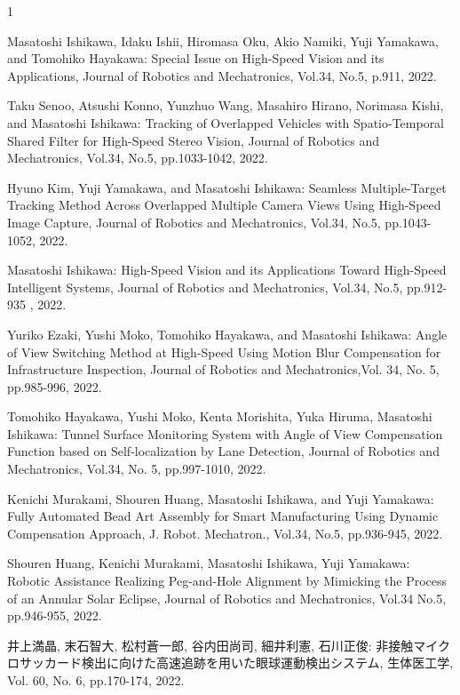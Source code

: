 \begin{雑誌論文}{1}

Masatoshi Ishikawa, Idaku Ishii, Hiromasa Oku, Akio Namiki, Yuji Yamakawa, and Tomohiko Hayakawa: Special Issue on High-Speed Vision and its Applications, Journal of Robotics and Mechatronics, Vol.34, No.5, p.911, 2022.

Taku Senoo, Atsushi Konno, Yunzhuo Wang, Masahiro Hirano, Norimasa Kishi, and Masatoshi Ishikawa: Tracking of Overlapped Vehicles with Spatio-Temporal Shared Filter for High-Speed Stereo Vision, Journal of Robotics and Mechatronics, Vol.34, No.5, pp.1033-1042, 2022.

Hyuno Kim, Yuji Yamakawa, and Masatoshi Ishikawa: Seamless Multiple-Target Tracking Method Across Overlapped Multiple Camera Views Using High-Speed Image Capture, Journal of Robotics and Mechatronics, Vol.34, No.5, pp.1043-1052, 2022.

Masatoshi Ishikawa: High-Speed Vision and its Applications Toward High-Speed Intelligent Systems, Journal of Robotics and Mechatronics, Vol.34, No.5, pp.912-935 , 2022.


Yuriko Ezaki, Yushi Moko, Tomohiko Hayakawa, and Masatoshi Ishikawa: Angle of View Switching Method at High-Speed Using Motion Blur Compensation for Infrastructure Inspection, Journal of Robotics and Mechatronics,Vol. 34, No. 5, pp.985-996, 2022.

Tomohiko Hayakawa, Yushi Moko, Kenta Morishita, Yuka Hiruma, Masatoshi Ishikawa: Tunnel Surface Monitoring System with Angle of View Compensation Function based on Self-localization by Lane Detection, Journal of Robotics and Mechatronics, Vol.34, No. 5, pp.997-1010, 2022.


Kenichi Murakami, Shouren Huang, Masatoshi Ishikawa, and Yuji Yamakawa: Fully Automated Bead Art Assembly for Smart Manufacturing Using Dynamic Compensation Approach, J. Robot. Mechatron., Vol.34, No.5, pp.936-945, 2022. 

Shouren Huang, Kenichi Murakami, Masatoshi Ishikawa, Yuji Yamakawa: Robotic Assistance Realizing Peg-and-Hole Alignment by Mimicking the Process of an Annular Solar Eclipse, Journal of Robotics and Mechatronics, Vol.34 No.5, pp.946-955, 2022. 


井上満晶, 末石智大, 松村蒼一郎, 谷内田尚司, 細井利憲, 石川正俊: 非接触マイクロサッカード検出に向けた高速追跡を用いた眼球運動検出システム, 生体医工学, Vol. 60, No. 6, pp.170-174, 2022.


\end{雑誌論文}

